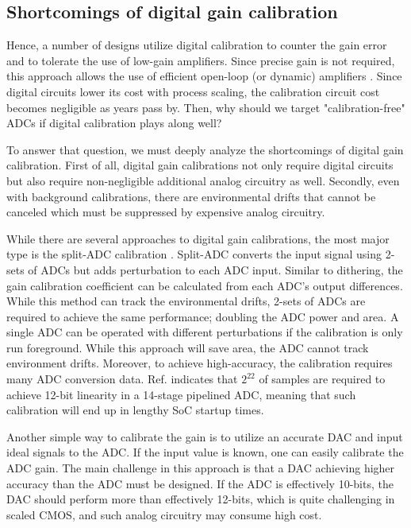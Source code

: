 \subsection{Shortcomings of digital gain calibration}

Hence, a number of designs utilize digital calibration to counter the gain error and to tolerate the use of low-gain amplifiers. Since precise gain is not required, this approach allows the use of efficient open-loop (or dynamic) amplifiers  \cite{murmann200312}\cite{verbruggen201470}\cite{zhou201512}\cite{verbruggen20132}. 
Since digital circuits lower its cost with process scaling, the calibration circuit cost becomes negligible as years pass by.
Then, why should we target "calibration-free" ADCs if digital calibration plays along well?

To answer that question, we must deeply analyze the shortcomings of digital gain calibration.
First of all, digital gain calibrations not only require digital circuits but also require non-negligible additional analog circuitry as well. Secondly, even with background calibrations, there are environmental drifts that cannot be canceled which must be suppressed by expensive analog circuitry.

While there are several approaches to digital gain calibrations, the most major type is the split-ADC calibration \cite{mcneill2005split1}.
Split-ADC converts the input signal using 2-sets of ADCs but adds perturbation to each ADC input. Similar to dithering, the gain calibration coefficient can be calculated from each ADC's output differences. While this method can track the environmental drifts, 2-sets of ADCs are required to achieve the same performance; doubling the ADC power and area.
A single ADC can be operated with different perturbations if the calibration is only run foreground. While this approach will save area, the ADC cannot track environment drifts. Moreover, to achieve high-accuracy, the calibration requires many ADC conversion data. Ref. \cite{digitalcalpipeline} indicates that $2^22$ of samples are required to achieve 12-bit linearity in a 14-stage pipelined ADC, meaning that such calibration will end up in lengthy SoC startup times.

Another simple way to calibrate the gain is to utilize an accurate DAC and input ideal signals to the ADC. If the input value is known, one can easily calibrate the ADC gain. The main challenge in this approach is that a DAC achieving higher accuracy than the ADC must be designed. If the ADC is effectively 10-bits, the DAC should perform more than effectively 12-bits, which is quite challenging in scaled CMOS, and such analog circuitry may consume high cost. 

